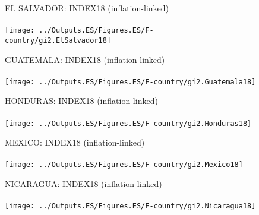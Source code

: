\documentclass{beamer}
\begin{document}
\begin{frame}
\begin{figure}
		\centering
		EL SALVADOR: INDEX18 (inflation-linked)\\~\\
		\texttt{[image: ../Outputs.ES/Figures.ES/F-country/gi2.ElSalvador18]}
	\end{figure}
\end{frame}

\begin{frame}
	
	\begin{figure}
		\centering
		GUATEMALA: INDEX18 (inflation-linked)\\~\\
		\texttt{[image: ../Outputs.ES/Figures.ES/F-country/gi2.Guatemala18]}
	\end{figure}
\end{frame}
%
\begin{frame}
	
	\begin{figure}
		\centering
		HONDURAS: INDEX18 (inflation-linked)\\~\\
		\texttt{[image: ../Outputs.ES/Figures.ES/F-country/gi2.Honduras18]}
	\end{figure}
\end{frame}
%
\begin{frame}
	
	\begin{figure}
		\centering
		MEXICO: INDEX18 (inflation-linked)\\~\\
		\texttt{[image: ../Outputs.ES/Figures.ES/F-country/gi2.Mexico18]}
	\end{figure}
\end{frame}
%
\begin{frame}
	
	\begin{figure}
		\centering
		NICARAGUA: INDEX18 (inflation-linked)\\~\\
		\texttt{[image: ../Outputs.ES/Figures.ES/F-country/gi2.Nicaragua18]}
	\end{figure}
\end{frame}
\end{document}
